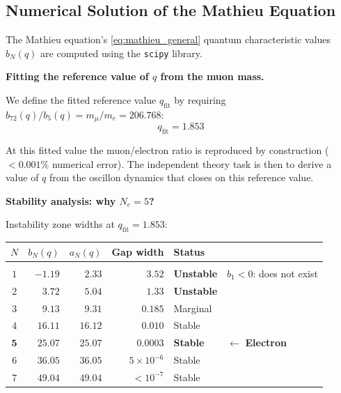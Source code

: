 \documentclass[11pt]{article}
\begin{document}
\subsection{Numerical Solution of the Mathieu Equation}
\label{sec:mathieu_numerical}

The Mathieu equation's \eqref{eq:mathieu_general}
quantum characteristic values $b_N(q)$ are computed using the
\texttt{scipy} library.

\medskip
\textbf{Fitting the reference value of $q$ from the muon mass.}

We define the fitted reference value $q_{\mathrm{fit}}$ by requiring
$b_{72}(q)/b_5(q) = m_\mu/m_e = 206.768$:
\begin{equation}
  \boxed{q_{\mathrm{fit}} = 1.853}
  \label{eq:q_value}
\end{equation}

At this fitted value the muon/electron ratio is reproduced
by construction ($< 0.001\%$ numerical error). The independent
theory task is then to derive a value of $q$ from the oscillon
dynamics that closes on this reference value.

\medskip
\textbf{Stability analysis: why $N_e = 5$?}

Instability zone widths at $q_{\mathrm{fit}} = 1.853$:

\begin{center}
\renewcommand{\arraystretch}{1.3}
\begin{tabular}{@{}crrrll@{}}
$N$ & $b_N(q)$ & $a_N(q)$ & Gap width & Status
  & \\[2pt]\hline\\[-6pt]
$1$ & $-1.19$ & $2.33$ & $3.52$
  & \textbf{Unstable}
  & $b_1 < 0$: does not exist\\
$2$ & $3.72$ & $5.04$ & $1.33$
  & \textbf{Unstable} & \\
$3$ & $9.13$ & $9.31$ & $0.185$
  & Marginal & \\
$4$ & $16.11$ & $16.12$ & $0.010$
  & Stable & \\
$\mathbf{5}$ & $\mathbf{25.07}$ & $\mathbf{25.07}$
  & $\mathbf{0.0003}$
  & \textbf{Stable}
  & $\leftarrow$ \textbf{Electron}\\
$6$ & $36.05$ & $36.05$ & $5 \times 10^{-6}$
  & Stable & \\
$7$ & $49.04$ & $49.04$ & $< 10^{-7}$
  & Stable & \\
\end{tabular}
\end{center}
\end{document}
